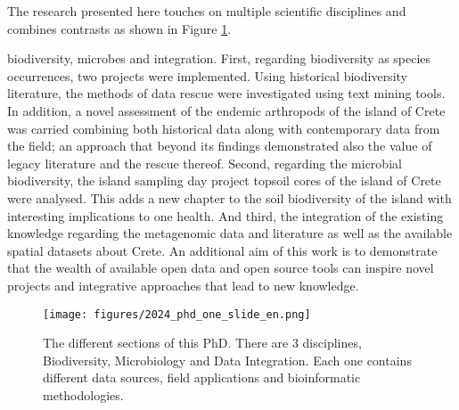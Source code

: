 The research presented here touches on multiple scientific disciplines and
combines contrasts as shown in Figure \ref{fig:phd-one-slide}. 


biodiversity, microbes and integration. 
First, regarding biodiversity as species occurrences, two projects were implemented.
Using historical biodiversity literature, the methods of data rescue were 
investigated using text mining tools.
In addition, a novel assessment of the endemic arthropods of the island of Crete
was carried combining both historical data along with contemporary data from the field;
an approach that beyond its findings demonstrated also the value of legacy
literature and the rescue thereof.
Second, regarding the microbial biodiversity, the island sampling day project 
topsoil cores of the island of Crete were analysed. This adds a new chapter to 
the soil biodiversity of the island with interesting implications to one health.
And third, the integration of the existing knowledge regarding the metagenomic 
data and literature as well as the available spatial datasets about Crete. 
An additional aim of this work is to demonstrate that the wealth of available open data
and open source tools can inspire novel projects and integrative approaches that lead
to new knowledge.

   \begin{figure}[ht]
      \centering
      \texttt{[image: figures/2024\_phd\_one\_slide\_en.png]}
      \caption[Graphical abstract of this PhD]{The different sections of this PhD. There are 3 disciplines, Biodiversity, Microbiology and Data Integration. Each one contains different data sources, field applications and bioinformatic methodologies.}
      \label{fig:phd-one-slide}
   \end{figure}



